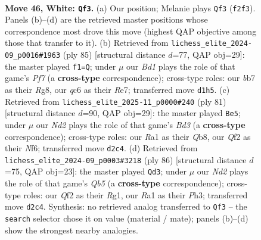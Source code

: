 \documentclass[11pt]{article}
\begin{document}
\clearpage

\begin{figure}[p]\centering
\begin{subfigure}{0.46\textwidth}\centering
\resizebox{\linewidth}{!}{%
\newchessgame
\chessboard[
  setfen={1r2r3/Rb3p1k/1pq2Bp1/8/7P/1P6/2PN1Q2/R2B2K1 w - - 5 46},
  showmover=false,
  pgfstyle=straightmove, color=movearrow, markmove={f2-f3}
]}
\caption{}
\end{subfigure}\hfill
\begin{subfigure}{0.46\textwidth}\centering
\resizebox{\linewidth}{!}{%
\newchessgame
\chessboard[
  setfen={6r1/4r2k/p2b2qp/3Q1p2/1P1R3P/P5n1/2R2pPK/B7 b - - 3 43},
  showmover=false,
  pgfstyle=straightmove, color=movearrow, markmove={f2-f1}
]}
\caption{}
\end{subfigure}
\\[4pt]
\begin{subfigure}{0.46\textwidth}\centering
\resizebox{\linewidth}{!}{%
\newchessgame
\chessboard[
  setfen={1q4k1/5pp1/3bpn1p/8/8/5PP1/1r3B1P/1B2QR1K b - - 4 41},
  showmover=false,
  pgfstyle=straightmove, color=movearrow, markmove={d6-e5}
]}
\caption{}
\end{subfigure}\hfill
\begin{subfigure}{0.46\textwidth}\centering
\resizebox{\linewidth}{!}{%
\newchessgame
\chessboard[
  setfen={8/r3r3/2B2k1p/1QpPq3/P2b4/4pp1P/8/3R2RK w - - 2 44},
  showmover=false,
  pgfstyle=straightmove, color=movearrow, markmove={b5-d3}
]}
\caption{}
\end{subfigure}
\caption{\textbf{Move 46, White: \texttt{Qf3}.} (a) Our position; Melanie plays \texttt{Qf3} (\texttt{f2f3}). Panels (b)--(d) are the retrieved master positions whose correspondence most drove this move (highest QAP objective among those that transfer to it). (b) Retrieved from \texttt{lichess\_elite\_2024-09\_p0016\#1963} (ply 85) [structural distance $d$=77, QAP obj=29]: the master played \texttt{f1=Q}; under $\mu$ our \emph{Bd1} plays the role of that game's \emph{Pf7} (a \textbf{cross-type} correspondence); cross-type roles: our \emph{b}b7 as their \emph{R}g8, our \emph{q}c6 as their \emph{R}e7; transferred move \texttt{d1h5}. (c) Retrieved from \texttt{lichess\_elite\_2025-11\_p0000\#240} (ply 81) [structural distance $d$=90, QAP obj=29]: the master played \texttt{Be5}; under $\mu$ our \emph{Nd2} plays the role of that game's \emph{Bd3} (a \textbf{cross-type} correspondence); cross-type roles: our \emph{R}a1 as their \emph{Q}b8, our \emph{Q}f2 as their \emph{N}f6; transferred move \texttt{d2c4}. (d) Retrieved from \texttt{lichess\_elite\_2024-09\_p0003\#3218} (ply 86) [structural distance $d$=75, QAP obj=23]: the master played \texttt{Qd3}; under $\mu$ our \emph{Nd2} plays the role of that game's \emph{Qb5} (a \textbf{cross-type} correspondence); cross-type roles: our \emph{Q}f2 as their \emph{R}g1, our \emph{R}a1 as their \emph{P}h3; transferred move \texttt{d2c4}. Synthesis: no retrieved analog transferred to \texttt{Qf3} -- the \texttt{search} selector chose it on value (material / mate); panels (b)--(d) show the strongest nearby analogies.}
\label{fig:thought-m90}
\end{figure}
\end{document}
